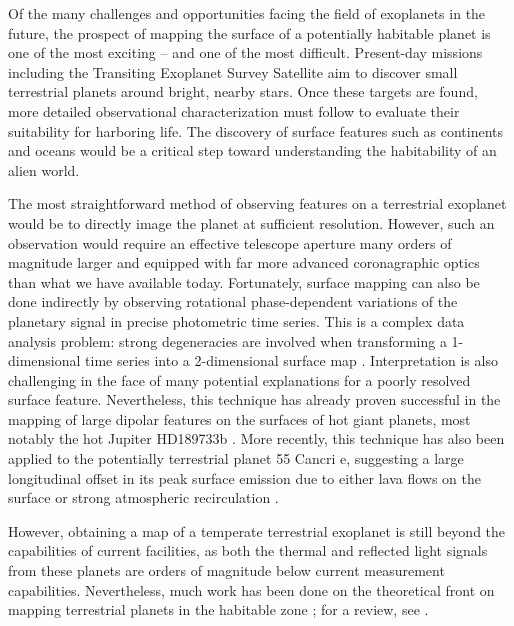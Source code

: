 \documentclass[modern]{aastex62}
\begin{document}
Of the many challenges and opportunities facing the field of exoplanets in the future, 
the prospect of mapping the surface of a potentially habitable planet is one of 
the most exciting -- and one of the most difficult. 
Present-day missions including the Transiting Exoplanet Survey Satellite 
\citep[\TESS; ][]{Ricker2015} aim to discover small terrestrial planets around 
bright, nearby stars. 
Once these targets are found, more detailed observational characterization 
must follow to evaluate their suitability for harboring life. 
The discovery of surface features such as continents and oceans would be a 
critical step toward understanding the habitability of an alien world.

The most straightforward method of observing features on a terrestrial exoplanet 
would be to directly image the planet at sufficient resolution. 
However, such an observation would require an effective telescope aperture many orders 
of magnitude larger and equipped with far more advanced coronagraphic optics
than what we have available today.
%
Fortunately, surface mapping can also be done indirectly by observing rotational 
phase-dependent variations of the planetary signal in precise photometric time series. 
This is a complex data analysis problem: strong degeneracies are involved when 
transforming a 1-dimensional time series into a 2-dimensional surface map
\citep{CowanFuentesHaggard2013}. 
Interpretation is also challenging in the face of many potential explanations 
for a poorly resolved surface feature. Nevertheless, this technique has
already proven successful in the mapping of large dipolar features on the surfaces
of hot giant planets, most notably the hot Jupiter HD189733b
\citep{Knutson2007,Majeau2012,deWit2012}. More recently, this technique has also
been applied to the potentially terrestrial planet 55 Cancri e, suggesting
a large longitudinal offset in its peak surface emission due to either
lava flows on the surface or strong atmospheric recirculation
\citep{Demory2016,Demory2016b,Hammond2017}.

However, obtaining a map of a temperate terrestrial exoplanet is still
beyond the capabilities of current facilities, as both the thermal and 
reflected light signals from these planets
are orders of magnitude below current measurement capabilities. Nevertheless,
much work has been done on the theoretical front on mapping terrestrial
planets in the habitable zone
\citep[e.g.,][]{Kawahara2010,Fujii2012,Berdyugina2017,Haggard2018,Lustig-Yaeger2018};
for a review, see \cite{Cowan2018}.
\end{document}
